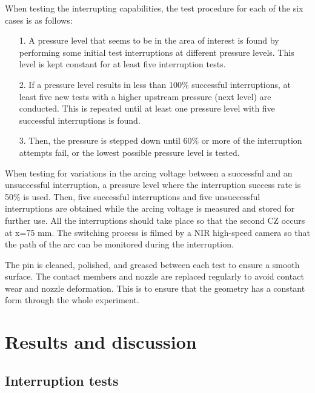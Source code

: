 \documentclass[10pt,b5paper,twoside]{article}
\begin{document}
When testing the interrupting capabilities, the test procedure for each of the six cases is as follows: 

\begin{itemize}
\item[1.] A pressure level that seems to be in the area of interest is found by performing some initial test interruptions at different pressure levels. This level is kept constant for at least five interruption tests.
\item[2.] If a pressure level results in less than 100\% successful interruptions, at least five new tests with a higher upstream pressure (next level) are conducted. This is repeated until at least one pressure level with five successful interruptions is found.
\item[3.] Then, the pressure is stepped down until 60\% or more of the interruption attempts fail, or the lowest possible pressure level is tested.
\end{itemize}

When testing for variations in the arcing voltage between a successful and an unsuccessful interruption, a pressure level where the interruption success rate is 50\% is used. Then, five successful interruptions and five unsuccessful interruptions are obtained while the arcing voltage is measured and stored for further use. All the interruptions should take place so that the second CZ occurs at x=75 mm. The switching process is filmed by a NIR high-speed camera so that the path of the arc can be monitored during the interruption.

The pin is cleaned, polished, and greased between each test to ensure a smooth surface. The contact members and nozzle are replaced regularly to avoid contact wear and nozzle deformation. This is to ensure that the geometry has a constant form through the whole experiment.
\cleardoublepage

\section{Results and discussion}
\subsection{Interruption tests} \label{sec:interruptionTests}
\end{document}
